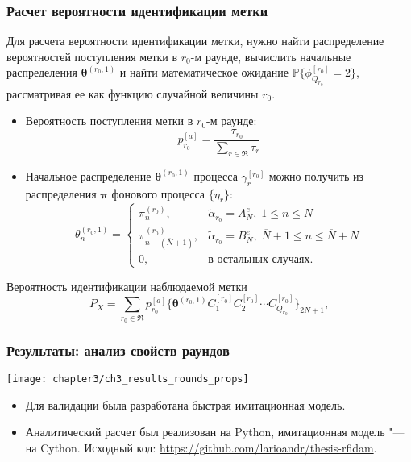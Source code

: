 \begin{frame}
    \frametitle{Расчет вероятности идентификации метки}
    \footnotesize
    Для расчета вероятности идентификации метки, нужно найти распределение вероятностей поступления метки в $r_0$-м раунде, вычислить начальные распределения $\bm{\theta}^{(r_0, 1)}$ и найти математическое ожидание $\mathbb{P}\{ \phi_{Q_{r_0}}^{[r_0]} = 2 \}$, рассматривая ее как функцию случайной величины $r_0$.
    \begin{itemize}
        \item Вероятность поступления метки в $r_0$-м раунде:
        $$
            p^{[a]}_{r_0} = \frac{\tau_{r_0}}{\sum_{r \in \mathfrak{R}} \tau_r}
        $$
        \item Начальное распределение $\bm{\theta}^{(r_0, 1)}$ процесса $\gamma_r^{[r_0]}$ можно получить из распределения $\bm{\pi}$ фонового процесса $\{ \eta_r \}$:
        $$
            \theta_n^{(r_0,1)} = \begin{cases}
                \pi^{(r_0)}_n,                      &\widetilde{\alpha}_{r_0} = A^e_N,\; 1 \leqslant n \leqslant N\\
                \pi^{(r_0)}_{n - (\overline{N}+1)}, &\widetilde{\alpha}_{r_0} = B^e_N,\; \overline{N}+1 \leqslant n \leqslant \overline{N}+N\\
                0,                                  &\text{в остальных случаях.}
            \end{cases}
        $$
    \end{itemize}
    \footnotesize
    \begin{block}{Вероятность идентификации наблюдаемой метки}
        $$
        	P_X = \sum\limits_{r_0 \in \mathfrak{R}} p_{r_0}^{[a]} \{ \bm{\theta}^{(r_0,1)} C_1^{[r_0]} C_2^{[r_0]} \cdots C_{Q_{r_0}}^{[r_0]} \}_{2\overline{N}+1},
        $$
    \end{block}
\end{frame}

\begin{frame}
    \frametitle{Результаты: анализ свойств раундов}
    \begin{center}
        \texttt{[image: chapter3/ch3\_results\_rounds\_props]}
    \end{center}
    \footnotesize
    \begin{itemize}
        \item Для валидации была разработана быстрая имитационная модель.
        \item Аналитический расчет был реализован на Python, имитационная модель "--- на Cython. Исходный код: \url{https://github.com/larioandr/thesis-rfidam}.
    \end{itemize}
\end{frame}

